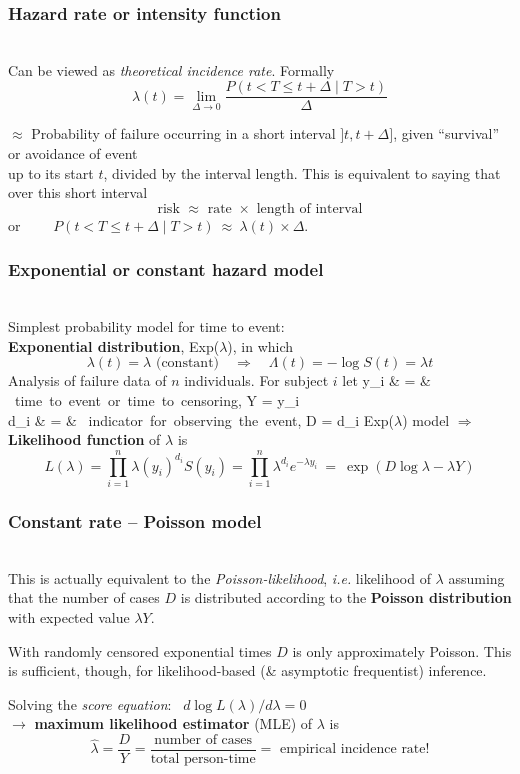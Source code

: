 \documentclass[handout,12pt]{beamer}
\begin{document}

\begin{frame} \frametitle{Hazard rate or intensity function}
\ \\
Can be viewed as \textit{theoretical incidence rate}. Formally
$$ \lambda(t) = \lim_{\Delta \rightarrow 0}
 \frac{P(t < T \leq t+\Delta \mid T > t)}{\Delta} $$
\bi
\item[$\approx$] Probability of failure occurring 
in a short interval $]t, t+ \Delta]$, given ``survival'' or
avoidance of event \\ 
up to its start $t$,  divided by the interval length.
\ei
This is equivalent to saying that over this short interval
$$ \mbox{risk } \approx  \mbox{ rate }\times 
\mbox{ length of interval} $$
or $\qquad P(t < T \leq t+\Delta \mid T > t) \ 
 \approx \ \lambda(t)\times \Delta$.
\end{frame} 


\begin{frame} \frametitle{Exponential or constant hazard model}
\ \\
Simplest probability model for time to event: \\
 {\bf Exponential distribution}, Exp($\lambda$), in which
$$
 \lambda(t) = \lambda \mbox{  (constant)}\quad 
\Rightarrow\quad 
 \Lambda(t) = - \log S(t) = \lambda t
$$
Analysis of failure data of $n$ individuals. 
For subject $i$ let
\bes
y_i & = & \mbox{ time to event or 
time to censoring,}\quad
  Y = \sum y_i \\
d_i & = & \mbox{ indicator for 
observing the event,}\quad
  D = \sum d_i
\ees
Exp($\lambda$) model $\Rightarrow$ 
\textbf{Likelihood function} of $\lambda$ is
$$ L(\lambda) = \prod_{i=1}^n \lambda(y_i)^{d_i} S(y_i)
     =  \prod_{i=1}^n \lambda^{d_i} e^{-\lambda y_i}
             \ = \ \exp( D \log \lambda -\lambda Y) $$
\end{frame} 


\begin{frame} \frametitle{Constant rate -- Poisson model}
\ \\ 
This is actually equivalent to the \textit{Poisson-likelihood},
\textit{i.e.} likelihood of $\lambda$
assuming that the number of cases 
$D$ is distributed according to the \textbf{Poisson
distribution} with expected value $\lambda Y$.

\bigskip
With randomly censored exponential times 
$D$ is only approximately Poisson. This is sufficient, though,
 for likelihood-based (\& asymptotic frequentist) inference.
 
 \bigskip
Solving the {\it score equation}: \ $d \log L(\lambda)/d\lambda = 0$ \\
$\rightarrow$ 
{\bf maximum likelihood estimator} (MLE) of $\lambda$ is
$$
 \widehat\lambda = \frac{D}{Y}  = 
  \frac{\mbox{number of cases}}
  {\mbox{total person-time}} 
  = \mbox{ empirical incidence rate!}
$$
\end{frame} 
\end{document}
